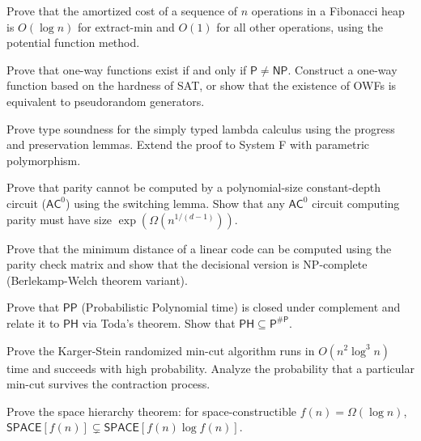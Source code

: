 \documentclass[12pt,a4paper]{exam}
\begin{document}
\begin{questions}
\vspace{0.3cm}

\question[4]
Prove that the amortized cost of a sequence of $n$ operations in a Fibonacci heap is $O(\log n)$ for extract-min and $O(1)$ for all other operations, using the potential function method.

\vspace{0.3cm}

\question[3]
Prove that one-way functions exist if and only if $\mathsf{P} \neq \mathsf{NP}$. Construct a one-way function based on the hardness of SAT, or show that the existence of OWFs is equivalent to pseudorandom generators.

\vspace{0.3cm}

\question[4]
Prove type soundness for the simply typed lambda calculus using the progress and preservation lemmas. Extend the proof to System F with parametric polymorphism.

\vspace{0.3cm}

\question[2]
Prove that parity cannot be computed by a polynomial-size constant-depth circuit ($\mathsf{AC}^0$) using the switching lemma. Show that any $\mathsf{AC}^0$ circuit computing parity must have size $\exp(\Omega(n^{1/(d-1)}))$.

\vspace{0.3cm}

\question[2]
Prove that the minimum distance of a linear code can be computed using the parity check matrix and show that the decisional version is NP-complete (Berlekamp-Welch theorem variant).

\vspace{0.3cm}

\question[2]
Prove that $\mathsf{PP}$ (Probabilistic Polynomial time) is closed under complement and relate it to $\mathsf{PH}$ via Toda's theorem. Show that $\mathsf{PH} \subseteq \mathsf{P}^{\#\mathsf{P}}$.

\vspace{0.3cm}

\question[5]
Prove the Karger-Stein randomized min-cut algorithm runs in $O(n^2 \log^3 n)$ time and succeeds with high probability. Analyze the probability that a particular min-cut survives the contraction process.

\vspace{0.3cm}

\question[7]
Prove the space hierarchy theorem: for space-constructible $f(n) = \Omega(\log n)$, $\mathsf{SPACE}[f(n)] \subsetneq \mathsf{SPACE}[f(n) \log f(n)]$.


\end{questions}
\end{document}
